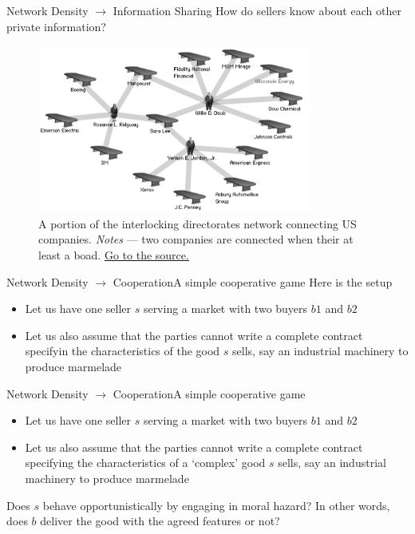 \documentclass[notes, aspectratio=1610]{beamer}
\begin{document}
\begin{frame}
	{Network Density $\rightarrow$ Information Sharing}
	{How do sellers know about each other private information?}
	\begin{figure}
			\includegraphics[width=0.8\textwidth]{images/interlock}
			\caption*{A portion of the interlocking directorates
			network connecting US companies.
			\textit{Notes} --- two companies are connected when their at 
			least a boad. \href{https://sites.google.com/site/occupypoliticsintheusa/interlocking-directorates-the-foundation-of-american-corporatocracy}
			{Go to the source.}}
	\end{figure}
\end{frame}

\begin{frame}{Network Density $\rightarrow$ Cooperation}{A simple cooperative game}
	Here is the setup 
	
	\begin{itemize}
		\item Let us have one seller $s$ serving a market with two 
		buyers $b1$ and $b2$
		\item Let us also assume that the parties cannot write a 
		complete contract specifyin the characteristics of the good 
		$s$ sells, say an industrial machinery to produce marmelade 
	\end{itemize}
\end{frame}

\begin{frame}{Network Density $\rightarrow$ Cooperation}{A simple cooperative game}
	\begin{itemize}
		\item Let us have one seller $s$ serving a market with two 
		buyers $b1$ and $b2$
		\item Let us also assume that the parties cannot write a 
		complete contract specifying the characteristics of a `complex' good 
		$s$ sells, say an industrial machinery to produce marmelade 
	\end{itemize}

	\vpsace{1em}

	Does $s$ behave opportunistically by engaging in moral hazard? In other 
	words, does $b$ deliver the good with the agreed features or not?
\end{frame}
\end{document}
